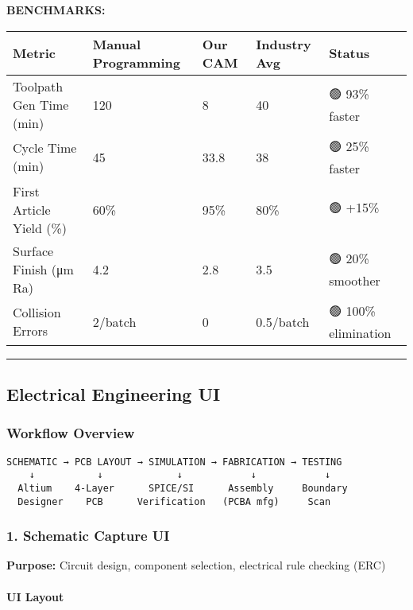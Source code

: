 \documentclass[
]{article}
\begin{document}
\textbf{BENCHMARKS:}

\begin{longtable}[]{@{}lllll@{}}
\toprule\noalign{}
Metric & Manual Programming & Our CAM & Industry Avg & Status \\
\midrule\noalign{}
\endhead
\bottomrule\noalign{}
\endlastfoot
Toolpath Gen Time (min) & 120 & 8 & 40 & 🟢 93\% faster \\
Cycle Time (min) & 45 & 33.8 & 38 & 🟢 25\% faster \\
First Article Yield (\%) & 60\% & 95\% & 80\% & 🟢 +15\% \\
Surface Finish (μm Ra) & 4.2 & 2.8 & 3.5 & 🟢 20\% smoother \\
Collision Errors & 2/batch & 0 & 0.5/batch & 🟢 100\% elimination \\
\end{longtable}

\begin{center}\rule{0.5\linewidth}{0.5pt}\end{center}

\hypertarget{electrical-engineering-ui}{%
\subsection{Electrical Engineering UI}\label{electrical-engineering-ui}}

\hypertarget{workflow-overview-1}{%
\subsubsection{Workflow Overview}\label{workflow-overview-1}}

\begin{verbatim}
SCHEMATIC → PCB LAYOUT → SIMULATION → FABRICATION → TESTING
    ↓           ↓             ↓            ↓            ↓
  Altium    4-Layer      SPICE/SI      Assembly     Boundary
  Designer    PCB      Verification   (PCBA mfg)     Scan
\end{verbatim}

\hypertarget{schematic-capture-ui}{%
\subsubsection{1. Schematic Capture UI}\label{schematic-capture-ui}}

\textbf{Purpose:} Circuit design, component selection, electrical rule
checking (ERC)

\hypertarget{ui-layout-2}{%
\paragraph{UI Layout}\label{ui-layout-2}}
\end{document}
